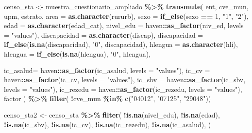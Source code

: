 \documentclass[
  12pt,
]{book}
\newenvironment{Shaded}{\begin{snugshade}}{\end{snugshade}}
\newcommand{\AttributeTok}[1]{\textcolor[rgb]{0.13,0.29,0.53}{#1}}
\newcommand{\DecValTok}[1]{\textcolor[rgb]{0.00,0.00,0.81}{#1}}
\newcommand{\FunctionTok}[1]{\textcolor[rgb]{0.13,0.29,0.53}{\textbf{#1}}}
\newcommand{\NormalTok}[1]{#1}
\newcommand{\OtherTok}[1]{\textcolor[rgb]{0.56,0.35,0.01}{#1}}
\newcommand{\SpecialCharTok}[1]{\textcolor[rgb]{0.81,0.36,0.00}{\textbf{#1}}}
\newcommand{\StringTok}[1]{\textcolor[rgb]{0.31,0.60,0.02}{#1}}
\begin{document}
\begin{Shaded}
\begin{Highlighting}[]
\NormalTok{censo\_sta }\OtherTok{\textless{}{-}}\NormalTok{ muestra\_cuestionario\_ampliado }\SpecialCharTok{\%\textgreater{}\%}
  \FunctionTok{transmute}\NormalTok{(}
\NormalTok{    ent,}
\NormalTok{    cve\_mun,}
\NormalTok{    upm,}
\NormalTok{    estrato,}
    \AttributeTok{area =} \FunctionTok{as.character}\NormalTok{(rururb),}
    \AttributeTok{sexo =} \FunctionTok{if\_else}\NormalTok{(sexo }\SpecialCharTok{==} \DecValTok{1}\NormalTok{, }\StringTok{"1"}\NormalTok{, }\StringTok{"2"}\NormalTok{),}
    \AttributeTok{edad =} \FunctionTok{as.character}\NormalTok{(edad\_cat),}
    \AttributeTok{nivel\_edu =}\NormalTok{ haven}\SpecialCharTok{::}\FunctionTok{as\_factor}\NormalTok{(niv\_ed, }\AttributeTok{levels  =} \StringTok{"values"}\NormalTok{),}
    \AttributeTok{discapacidad =} \FunctionTok{as.character}\NormalTok{(discap),}
    \AttributeTok{discapacidad =} \FunctionTok{if\_else}\NormalTok{(}\FunctionTok{is.na}\NormalTok{(discapacidad), }\StringTok{"0"}\NormalTok{, discapacidad),}
    \AttributeTok{hlengua =} \FunctionTok{as.character}\NormalTok{(hli),}
    \AttributeTok{hlengua =} \FunctionTok{if\_else}\NormalTok{(}\FunctionTok{is.na}\NormalTok{(hlengua), }\StringTok{"0"}\NormalTok{, hlengua),}
    
    \AttributeTok{ic\_asalud=}\NormalTok{ haven}\SpecialCharTok{::}\FunctionTok{as\_factor}\NormalTok{(ic\_asalud, }\AttributeTok{levels  =} \StringTok{"values"}\NormalTok{),}
    \AttributeTok{ic\_cv =}\NormalTok{ haven}\SpecialCharTok{::}\FunctionTok{as\_factor}\NormalTok{(ic\_cv, }\AttributeTok{levels  =} \StringTok{"values"}\NormalTok{),}
    \AttributeTok{ic\_sbv =}\NormalTok{ haven}\SpecialCharTok{::}\FunctionTok{as\_factor}\NormalTok{(ic\_sbv, }\AttributeTok{levels  =} \StringTok{"values"}\NormalTok{),}
    \AttributeTok{ic\_rezedu =}\NormalTok{ haven}\SpecialCharTok{::}\FunctionTok{as\_factor}\NormalTok{(ic\_rezedu, }\AttributeTok{levels  =} \StringTok{"values"}\NormalTok{),}
\NormalTok{    factor}
\NormalTok{  ) }\SpecialCharTok{\%\textgreater{}\%} 
  \FunctionTok{filter}\NormalTok{( }\SpecialCharTok{!}\NormalTok{cve\_mun }\SpecialCharTok{\%in\%} \FunctionTok{c}\NormalTok{(}\StringTok{"04012"}\NormalTok{, }\StringTok{"07125"}\NormalTok{, }\StringTok{"29048"}\NormalTok{))}




\NormalTok{censo\_sta2 }\OtherTok{\textless{}{-}}\NormalTok{ censo\_sta }\SpecialCharTok{\%\textgreater{}\%}
  \FunctionTok{filter}\NormalTok{(}
    \SpecialCharTok{!}\FunctionTok{is.na}\NormalTok{(nivel\_edu),}
    \SpecialCharTok{!}\FunctionTok{is.na}\NormalTok{(edad),}
    \SpecialCharTok{!}\FunctionTok{is.na}\NormalTok{(ic\_sbv),}
    \SpecialCharTok{!}\FunctionTok{is.na}\NormalTok{(ic\_cv),}
    \SpecialCharTok{!}\FunctionTok{is.na}\NormalTok{(ic\_rezedu),}
    \SpecialCharTok{!}\FunctionTok{is.na}\NormalTok{(ic\_asalud),}
\NormalTok{  )}


\end{Highlighting}
\end{Shaded}
\end{document}
